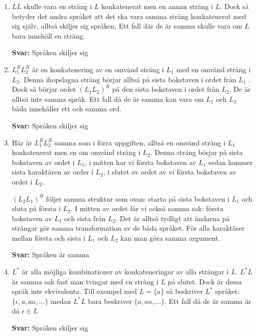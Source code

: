 \documentclass{article}
\begin{document}
\begin{enumerate}[label=(\alph*)]
    \item 
    $LL$ skulle vara en sträng i $L$ konkatenerat men en annan sträng i $L$. Dock så betyder det andra språket att det ska vara samma sträng konkatenerat med sig själv, alltså skiljer sig språken. Ett fall där de är samma skulle vara om $L$ bara innehöll en sträng.
    
    \textbf{Svar: } Språken skiljer sig
    
    \item
    $L_1^R L_2^R$ är en konkatenering av en omvänd sträng i $L_1$  med en omvänd sträng i $L_2$. Denna ihopslagna sträng börjar alltså på sista bokstaven i ordet från $L_1$ . Dock så börjar ordet $(L_1 L_2)^R$ på den sista bokstaven i ordet från $L_2$. De är alltså inte samma språk. Ett fall då de är samma kan vara om $L_1$ och $L_2$ båda innehåller ett och samma ord.
    
    \textbf{Svar: } Språken skiljer sig
    
    \item
    Här är $L_1^R L_2^R$ samma som i förra uppgiften, alltså en omvänd sträng i $L_1$ konkatenerat men en om omvänd sträng i $L_2$. Denna sträng börjar på sista bokstaven av ordet i $L_1$, i mitten har vi första bokstaven av $L_1$ sedan kommer sista karaktären av order i $L_2$, i slutet av ordet av vi första bokstaven av ordet i $L_2$.
    
    $(L_2 L_1)^R$ följer samma struktur som ovan: starta på sista bokstaven i $L_1$ och sluta på första i $L_2$. I mitten av ordet får vi också samma sak: första bokstaven av $L_1$ och sista från $L_2$. Det är alltså tydligt att ändarna på strängar gör samma transformation av de båda språket. För alla karaktärer mellan första och sista i $L_1$ och $L_2$ kan man göra samma argument. 
    
    \textbf{Svar: } Språken är samma

    \item
    $L^*$ är alla möjliga kombinationer av konkateneringar av alla strängar i $L$. $L^*L$ är samma sak fast man tvingar med en sträng i $L$ på slutet. Dock är dessa språk inte ekvivalenta. Till exempel med $L=\{a\}$ så beskriver $L^*$ språket: $\{\epsilon, a, aa, ...\}$ medan $L^*L$ bara beskriver $\{a, aa, ...\}$. Ett fall då de är samma är då $\epsilon \in L$
    
    \textbf{Svar: } Språken skiljer sig
    
\end{enumerate}
\end{document}
